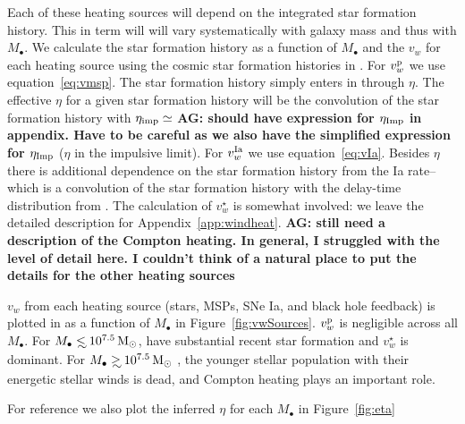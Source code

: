 \documentclass[usenatbib,fleqn]{mn2e}
\newcommand\lsim{\mathrel{\rlap{\lower4pt\hbox{\hskip1pt$\sim$}}
    \raise1pt\hbox{$<$}}}
\newcommand\gsim{\mathrel{\rlap{\lower4pt\hbox{\hskip1pt$\sim$}}
    \raise1pt\hbox{$>$}}}
\newcommand{\Mbh}[1][]{M_{\bullet#1}}
\newcommand{\vwO}{v_{w}}
\begin{document}
Each of these heating sources will depend on the integrated star
formation history. This in term will will vary systematically with
galaxy mass and thus with $\Mbh$.  
We calculate the star formation history as a function of $\Mbh$ and
the $\vwO$ for each heating source using the cosmic star formation
histories in \citet{MosterNaab+:2013a}.  For $v_{w}^{\rm p}$ we
use equation~\eqref{eq:vmsp}. The star formation history simply enters
in through $\eta$. The effective $\eta$ for a given star formation
history will be the convolution of the star formation history with
$\eta_{\rm imp}\simeq $ {\bf AG: should have expression for $\eta_{\rm
    Imp}$ in appendix. Have to be careful as we also have the
  simplified expression for $\eta_{\rm Imp}$} ($\eta$ in the impulsive
limit). For $v_{w}^{\rm Ia}$ we use
equation~\eqref{eq:vIa}. Besides $\eta$ there is additional dependence
on the star formation history from the Ia rate--which is a convolution
of the star formation history with the delay-time distribution from
\citet{MaozMannucci+:2012a}. The calculation of $v_{w}^{\star}$
is somewhat involved: we leave the detailed description for
Appendix~\ref{app:windheat}. {\bf AG: still need a description of the
  Compton heating. In general, I struggled with the level of detail
  here. I couldn't think of a natural place to put the details for the
  other heating sources}

$\vwO$ from each heating source (stars, MSPs, SNe Ia, and black hole
feedback) is plotted in as a function of $\Mbh$ in
Figure~\ref{fig:vwSources}. $v_{w}^{\rm p}$ is negligible across
all $\Mbh$. For $\Mbh\lsim 10^{7.5} \Msun$, have substantial recent
star formation and $v_{w}^{\star}$ is dominant. For $\Mbh\gsim
10^{7.5} \Msun$ , the younger stellar population with their energetic
stellar winds is dead, and Compton heating plays an important role.

For reference we also plot the inferred $\eta$ for each $\Mbh$ in
Figure~\ref{fig:eta} 
\end{document}
